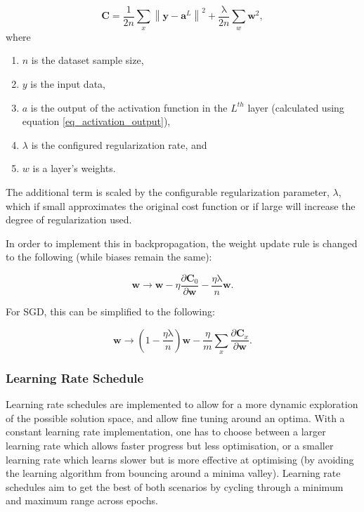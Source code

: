 \documentclass[a4paper,11pt,oneside]{article}
\theoremstyle{plain}
\theoremstyle{definition}
\begin{document}
	\begin{equation}\label{func_l2reg}
	\mathbf{C}=\frac{1}{2 n} \sum_{x}\left\|\mathbf{y}-\mathbf{a}^{L}\right\|^{2}+\frac{\mathrm{\lambda}}{2 n} \sum_{w} \mathbf{w}^{2},
	\end{equation}
	where
	\begin{enumerate}
		\item $n$ is the dataset sample size,
		\item $y$ is the input data,
		\item $a$ is the output of the activation function in the $L^{th}$ layer (calculated using equation \eqref{eq_activation_output}),
		\item $\lambda$ is the configured regularization rate, and
		\item $w$ is a layer's weights.
	\end{enumerate}
	
	The additional term is scaled by the configurable regularization parameter, $\lambda$, which if small approximates the original cost function or if large will increase the degree of regularization used. \newline
	
	In order to implement this in backpropagation, the weight update rule is changed to the following (while biases remain the same):
	
	\begin{equation}\label{func_l2_weight_update}
	\mathbf{w} \rightarrow \mathbf{w}-\eta \frac{\partial \mathbf{C}_{0}}{\partial \mathbf{w}}-\frac{\eta \mathrm{\lambda}}{n} \mathbf{w} .
	\end{equation}
	
	For SGD, this can be simplified to the following: 
	
	\begin{equation}\label{func_sgd_l2}
	\mathbf{w} \rightarrow\left(1-\frac{\eta \mathrm{\lambda}}{n}\right) \mathbf{w}-\frac{\eta}{m} \sum_{x} \frac{\partial \mathbf{C}_{x}}{\partial \mathbf{w}} .
	\end{equation}
	
	
	\subsubsection{Learning Rate Schedule}\label{imp_learning_rate_schedule}
	
	Learning rate schedules are implemented to allow for a more dynamic exploration of the possible solution space, and allow fine tuning around an optima. With a constant learning rate implementation, one has to choose between a larger learning rate which allows faster progress but less optimisation, or a smaller learning rate which learns slower but is more effective at optimising (by avoiding the learning algorithm from bouncing around a minima valley). Learning rate schedules aim to get the best of both scenarios by cycling through a minimum and maximum range across epochs.\newline
	
\end{document}
